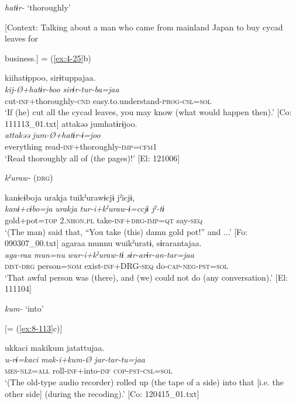   \textit{hatɨr-} ‘thoroughly’


\ex{} [Context: Talking about a man who came from mainland Japan to buy cycad leaves for

business.] = (\ref{ex:4-25}b)

{\TM}
\glll  kiihatɨppoo,  sirɨtuppajaa.\\
\textit{kij-Ø+hatɨr-boo  sirɨr-tur-ba=jaa}\\
cut-\textsc{inf}+thoroughly-\textsc{cnd}  easy.to.understand-\textsc{prog}-\textsc{csl}=\textsc{sol}\\
\glt ‘If (he) cut all the cycad leaves, you may know (what would happen then).’ [Co: 111113\_01.txt]
\ex
{\TM}
\glll  attakəə  jumhatɨrɨjoo.\\
\textit{attakəə}  \textit{jum-Ø+hatɨr-ɨ=joo}\\
everything  read-\textsc{inf}+thoroughly-\textsc{imp}=\textsc{cfm1}\\
\glt ‘Read thoroughly all of (the pages)!’ [El: 121006]

  \textit{kˀuraw-} (\textsc{drg})

\ex
{\TM}
\glll  kanɨcɨboja  urakja  tuikˀurawɨcjɨ  jˀicjɨ,\\
\textit{kanɨ+cɨbo=ja}  \textit{urakja}  \textit{tur-i+kˀuraw-ɨ=ccjɨ  jˀ-tɨ}\\
gold+pot=\textsc{top}  2.\textsc{nhon}.\textsc{pl}  take-\textsc{inf}+\textsc{drg}-\textsc{imp}=\textsc{qt}  say-\textsc{seq}\\
\glt ‘(The man) said that, “You take (this) damn gold pot!” and ...’ [Fo: 090307\_00.txt]
\ex
{\TM}
\glll  agaraa  munnu  wuikˀuratɨ,  sɨrarantajaa.\\
\textit{aga-raa}  \textit{mun=nu}  \textit{wur-i+kˀuraw-tɨ  sɨr-arɨr-an-tar=jaa}\\
\textsc{dist}-\textsc{drg}  person=\textsc{nom}  exist-\textsc{inf}+DRG-\textsc{seq}  do-\textsc{cap}-\textsc{neg}-\textsc{pst}=\textsc{sol}\\
\glt ‘That awful person was (there), and (we) could not do (any conversation).’ [El: 111104]

  \textit{kum-} ‘into’


\ex{} [= (\ref{ex:8-113}c)]

{\TM}
\glll  ukkaci  makikum  jatattujaa.\\
\textit{u-rɨ=kaci}  \textit{mak-i+kum-Ø  jar-tar-tu=jaa}\\
\textsc{mes}-\textsc{nlz}=\textsc{all}  roll-\textsc{inf}+into-\textsc{inf}  \textsc{cop}-\textsc{pst}-\textsc{csl}=\textsc{sol}\\
\glt ‘(The old-type audio recorder) rolled up (the tape of a side) into that [i.e. the other side] (during the recoding).’ [Co: 120415\_01.txt]


